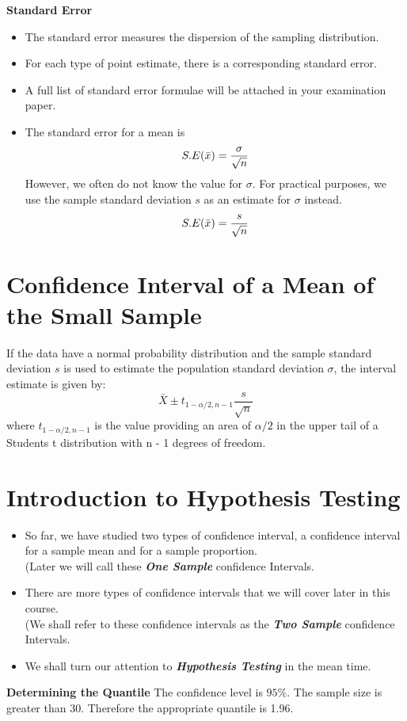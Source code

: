 \documentclass[]{report}
\begin{document}


\textbf{Standard Error}

\begin{itemize}
\item The standard error measures the dispersion of the sampling distribution.
\item For each type of point estimate, there is a corresponding standard error.
\item A full list of standard error formulae will be attached in your examination paper.
\item The standard error for a  mean is
\[ S.E( \bar{x} )  = {\sigma \over \sqrt{n}} \]
However, we often do not know the value for $\sigma$. For practical purposes, we use the sample standard deviation $s$ as an estimate for $\sigma$ instead.
\[ S.E( \bar{x} )  = {s \over \sqrt{n}} \]
\end{itemize}







\section{Confidence Interval of a Mean of the Small Sample}

If the data have a normal probability distribution and the sample standard deviation $s$ is used to estimate the population standard deviation $\sigma$, the interval estimate is given by:
\begin{equation}
\bar{X} \pm t_{1-\alpha/2,n-1}\frac{s}{\sqrt{n}}
\end{equation}
where $t_{1-\alpha/2,n-1}$ is the value providing an area of $\alpha/2$ in the upper tail of a Students t distribution with n - 1 degrees of freedom.


\newpage
\section{Introduction to Hypothesis Testing}
\begin{itemize}
\item So far, we have studied two types of confidence interval, a confidence interval for a sample mean and for a sample proportion.\\ (Later we will call these \textbf{\textit{One Sample}} confidence Intervals.
\item There are more types of confidence intervals that we will cover later in this course. \\ (We shall refer to these confidence intervals as the \textbf{\textit{Two Sample}} confidence Intervals.
\item We shall turn our attention to \textit{\textbf{Hypothesis Testing}} in the mean time.
\end{itemize}


\textbf{Determining the Quantile}
The confidence level is $95\%$. The sample size is greater than 30. Therefore the appropriate quantile is 1.96.\\
\end{document}
